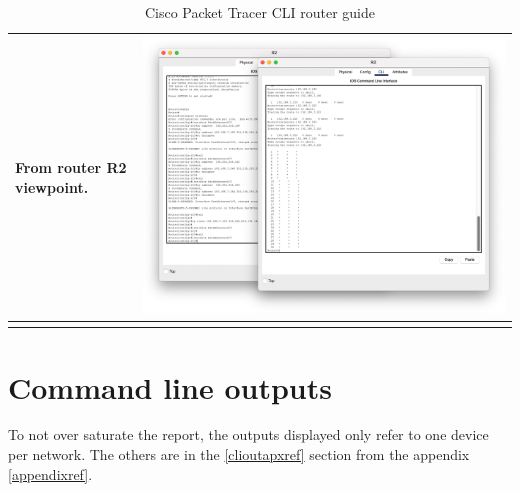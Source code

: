 \documentclass[11pt,a4paper]{report}
\begin{document}
\begin{flushleft}
\begin{center}
\begin{longtable}{ m{5cm} l }
                        From router R2 viewpoint.   & \includegraphics[scale=0.25 ,valign=c]{r2-cliall} \\ \hline

                        \caption{Cisco Packet Tracer CLI router guide}
                        \label{tab:cptg2.5}
                    \end{longtable}
                \end{center}
        \end{flushleft}

    \section{Command line outputs}
        To not over saturate the report, the outputs displayed only refer to one device per network. The others are in the \ref{clioutapxref} section from the appendix \ref{appendixref}.

        \lstset{style=termoutputs}
        

        

        

        
\end{document}
